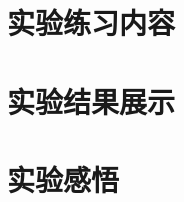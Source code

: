 \documentclass{my_report}
\begin{document}
 

 
\section{实验练习内容}
\subsection{}
\subsubsection{}
 
\newpage
\section{实验结果展示}
\subsection{}
\subsubsection{}

\newpage
\section{实验感悟}
\subsection{}
\subsubsection{}
 
\end{document}
